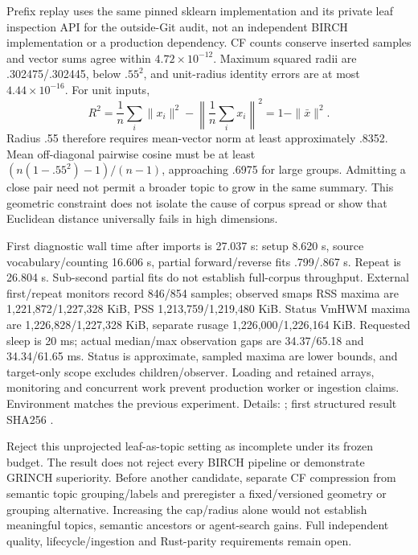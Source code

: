 \documentclass[11pt]{article}
\begin{document}
Prefix replay uses the same pinned sklearn implementation and its private leaf
inspection API for the outside-Git audit, not an independent BIRCH implementation
or a production dependency. CF counts conserve inserted samples and vector sums
agree within $4.72\times10^{-12}$. Maximum squared radii are .302475/.302445,
below $.55^2$, and unit-radius identity errors are at most
$4.44\times10^{-16}$. For unit inputs,
\[
 R^2=\frac{1}{n}\sum_i\|x_i\|^2-\left\|\frac{1}{n}\sum_i x_i\right\|^2
 =1-\|\bar{x}\|^2.
\]
Radius .55 therefore requires mean-vector norm at least approximately .8352.
Mean off-diagonal pairwise cosine must be at least
$(n(1-.55^2)-1)/(n-1)$, approaching .6975 for large groups. Admitting a close
pair need not permit a broader topic to grow in the same summary. This geometric
constraint does not isolate the cause of corpus spread or show that Euclidean
distance universally fails in high dimensions.

First diagnostic wall time after imports is 27.037 s: setup 8.620 s, source
vocabulary/counting 16.606 s, partial forward/reverse fits .799/.867 s. Repeat
is 26.804 s. Sub-second partial fits do not establish full-corpus throughput.
External first/repeat monitors record 846/854 samples; observed smaps RSS maxima
are 1,221,872/1,227,328 KiB, PSS 1,213,759/1,219,480 KiB. Status VmHWM maxima
are 1,226,828/1,227,328 KiB, separate rusage 1,226,000/1,226,164 KiB. Requested
sleep is 20 ms; actual median/max observation gaps are 34.37/65.18 and
34.34/61.65 ms. Status is approximate, sampled maxima are lower bounds, and
target-only scope excludes children/observer. Loading and retained arrays,
monitoring and concurrent work prevent production worker or ingestion claims.
Environment matches the previous experiment. Details:
; first structured result
SHA256 .

Reject this unprojected leaf-as-topic setting as incomplete under its frozen
budget. The result does not reject every BIRCH pipeline or demonstrate GRINCH
superiority. Before another candidate, separate CF compression from semantic
topic grouping/labels and preregister a fixed/versioned geometry or grouping
alternative. Increasing the cap/radius alone would not establish meaningful
topics, semantic ancestors or agent-search gains. Full independent quality,
lifecycle/ingestion and Rust-parity requirements remain open.
\end{document}
